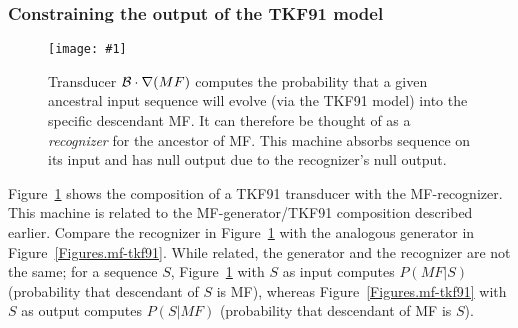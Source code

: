 \documentclass{article}
\newcommand{\figref}[1]{Figure~\ref{Figures.#1}}
\newcommand{\figlabel}[1]{\label{Figures.#1}}
\newcommand{\easyfig}[4]{
\begin{figure}
\texttt{[image: \#1]}
\caption{ \figlabel{#3} #4}
\end{figure}}
\newcommand{\tallpdffig}[2]{\easyfig{#1-fig.pdf}{height=\textheight}{#1}{#2}}
\newcommand\tkf{{\cal B}}
\newcommand\recognize{\nabla}
\begin{document}

\subsubsection{Constraining the output of the TKF91 model}

\tallpdffig{tkf91-mf}{Transducer $\tkf \cdot \recognize(MF)$
computes the probability that a given ancestral input sequence will evolve (via the TKF91 model) into the specific descendant MF.  
It can therefore be thought of as a {\em recognizer} for the ancestor of MF.
This machine absorbs sequence on its input and has null output due to 
the recognizer's null output.}

\figref{tkf91-mf} shows the composition of a TKF91 transducer with the MF-recognizer.  
This machine is related to the MF-generator/TKF91 composition described  earlier.  
Compare the recognizer in \figref{tkf91-mf}
with the analogous generator in \figref{mf-tkf91}. 
While related, the generator and the recognizer are not the same;
for a sequence $S$,
\figref{tkf91-mf} with $S$ as input computes $P(MF|S)$
(probability that descendant of $S$ is MF), 
whereas \figref{mf-tkf91} with $S$ as output computes $P(S|MF)$
(probability that descendant of MF is $S$).
\end{document}
